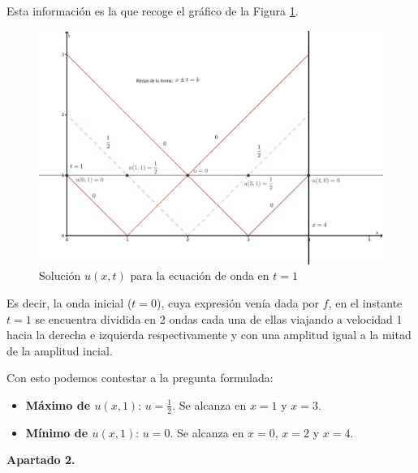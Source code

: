 \documentclass[bibnumbers, palatino]{apuntes}
\begin{document}
\begin{problem}
Esta información es la que recoge el gráfico de la Figura \ref{fig:onda}.
\begin{figure}[hbtp]
\centering
\includegraphics[width =1.1\textwidth]{img1}
\caption{Solución $u(x,t)$ para la ecuación de onda en $t=1$}
\label{fig:onda}
\end{figure}

Es decir, la onda inicial ($t=0$), cuya expresión venía dada por $f$, en el instante $t=1$ se encuentra dividida en 2 ondas cada una de ellas viajando a velocidad 1 hacia la derecha e izquierda respectivamente y con una amplitud igual a la mitad de la amplitud incial.

\newpage Con esto podemos contestar a la pregunta formulada:
\begin{itemize}
\item \textbf{Máximo de $u(x,1)$}: $u=\frac{1}{2}$. Se alcanza en $x=1$ y $x=3$.
\item \textbf{Mínimo de $u(x,1)$}: $u=0$. Se alcanza en $x=0$, $x=2$ y $x=4$.
\end{itemize}
\newpage
\textbf{Apartado 2.} \newline


\end{problem}
\end{document}
